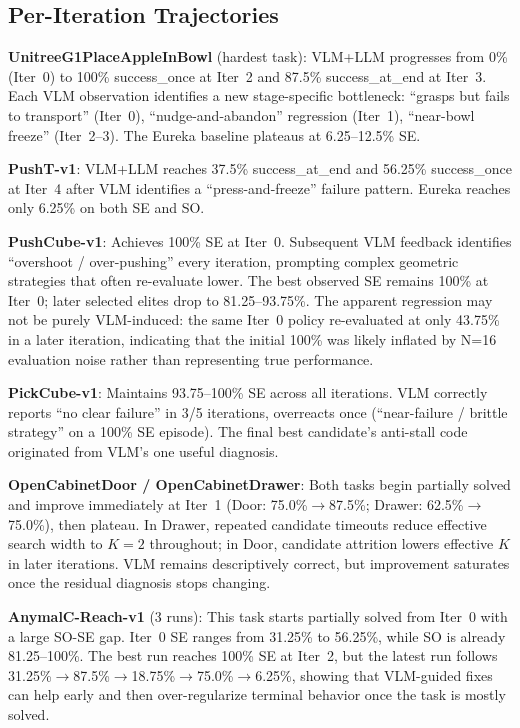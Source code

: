\documentclass[conference]{IEEEtran}
\begin{document}
\subsection{Per-Iteration Trajectories}

\textbf{UnitreeG1PlaceAppleInBowl} (hardest task): VLM+LLM progresses from 0\%
(Iter~0) to 100\% success\_once at Iter~2 and 87.5\% success\_at\_end at
Iter~3. Each VLM observation identifies a new stage-specific bottleneck:
``grasps but fails to transport'' (Iter~0), ``nudge-and-abandon'' regression
(Iter~1), ``near-bowl freeze'' (Iter~2--3). The Eureka baseline plateaus at
6.25--12.5\% SE.

\textbf{PushT-v1}: VLM+LLM reaches 37.5\% success\_at\_end and 56.25\%
success\_once at Iter~4 after VLM identifies a ``press-and-freeze'' failure
pattern. Eureka reaches only 6.25\% on both SE and SO.

\textbf{PushCube-v1}: Achieves 100\% SE at Iter~0. Subsequent VLM feedback
identifies ``overshoot / over-pushing'' every iteration, prompting complex
geometric strategies that often re-evaluate lower. The best observed SE remains
100\% at Iter~0; later selected elites drop to 81.25--93.75\%. The apparent
regression may not be purely VLM-induced: the same Iter~0
policy re-evaluated at only 43.75\% in a later iteration, indicating that the
initial 100\% was likely inflated by N=16 evaluation noise rather than
representing true performance.

\textbf{PickCube-v1}: Maintains 93.75--100\% SE across all iterations. VLM
correctly reports ``no clear failure'' in 3/5 iterations, overreacts once
(``near-failure / brittle strategy'' on a 100\% SE episode). The final best
candidate's anti-stall code originated from VLM's one useful diagnosis.

\textbf{OpenCabinetDoor / OpenCabinetDrawer}: Both tasks begin partially solved
and improve immediately at Iter~1 (Door: 75.0\%$\to$87.5\%; Drawer:
62.5\%$\to$75.0\%), then plateau. In Drawer, repeated candidate timeouts reduce
effective search width to $K=2$ throughout; in Door, candidate attrition lowers
effective $K$ in later iterations. VLM remains descriptively correct, but
improvement saturates once the residual diagnosis stops changing.

\textbf{AnymalC-Reach-v1} (3 runs): This task starts partially solved from
Iter~0 with a large SO-SE gap. Iter~0 SE ranges from 31.25\% to 56.25\%, while
SO is already 81.25--100\%. The best run reaches 100\% SE at Iter~2, but the
latest run follows 31.25\%$\to$87.5\%$\to$18.75\%$\to$75.0\%$\to$6.25\%,
showing that VLM-guided fixes can help early and then over-regularize terminal
behavior once the task is mostly solved.
\end{document}
